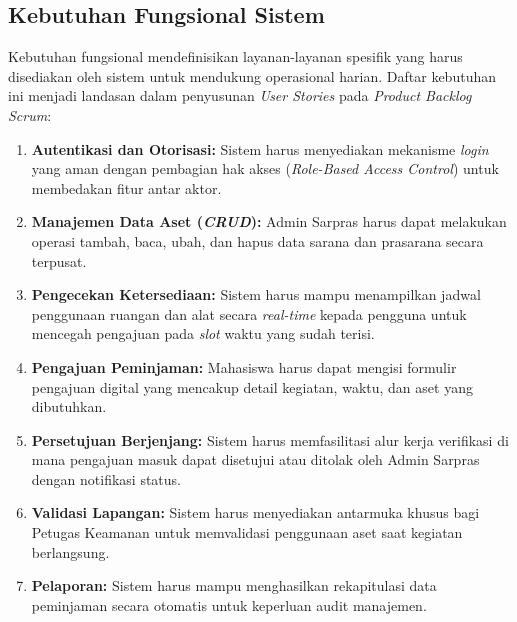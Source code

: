 \subsection{Kebutuhan Fungsional Sistem}
Kebutuhan fungsional mendefinisikan layanan-layanan spesifik yang harus disediakan oleh sistem untuk mendukung operasional harian. Daftar kebutuhan ini menjadi landasan dalam penyusunan \textit{User Stories} pada \textit{Product Backlog} \textit{Scrum}:
\begin{enumerate}
    \item \textbf{Autentikasi dan Otorisasi:} Sistem harus menyediakan mekanisme \textit{login} yang aman dengan pembagian hak akses (\textit{Role-Based Access Control}) untuk membedakan fitur antar aktor.
    \item \textbf{Manajemen Data Aset (\textit{CRUD}):} Admin Sarpras harus dapat melakukan operasi tambah, baca, ubah, dan hapus data sarana dan prasarana secara terpusat.
    \item \textbf{Pengecekan Ketersediaan:} Sistem harus mampu menampilkan jadwal penggunaan ruangan dan alat secara \textit{real-time} kepada pengguna untuk mencegah pengajuan pada \textit{slot} waktu yang sudah terisi.
    \item \textbf{Pengajuan Peminjaman:} Mahasiswa harus dapat mengisi formulir pengajuan digital yang mencakup detail kegiatan, waktu, dan aset yang dibutuhkan.
    \item \textbf{Persetujuan Berjenjang:} Sistem harus memfasilitasi alur kerja verifikasi di mana pengajuan masuk dapat disetujui atau ditolak oleh Admin Sarpras dengan notifikasi status.
    \item \textbf{Validasi Lapangan:} Sistem harus menyediakan antarmuka khusus bagi Petugas Keamanan untuk memvalidasi penggunaan aset saat kegiatan berlangsung.
    \item \textbf{Pelaporan:} Sistem harus mampu menghasilkan rekapitulasi data peminjaman secara otomatis untuk keperluan audit manajemen.
\end{enumerate}

